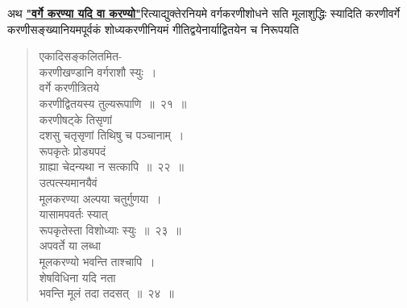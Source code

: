 \documentclass[11pt, openany]{book}
\begin{document}
 अथ \hyperref[19]{\textbf{"वर्गे करण्या यदि वा करण्यो"}}रित्याद्युक्तेरनियमे वर्गकरणीशोधने सति मूलाशुद्धिः स्यादिति करणीवर्गे करणीसङ्ख्यानियमपूर्वकं शोध्यकरणीनियमं गीतिद्वयेनार्याद्वितयेन च निरूपयति\textendash  
\begin{quote}
    \bs
      एकादिसङ्कलितमित-\\

\vspace{-7mm}
\hspace{1cm} करणीखण्डानि वर्गराशौ स्युः~। \\

\vspace{-7mm}
 वर्गे करणीत्रितये \\

\vspace{-7mm}
\hspace{1cm} करणीद्वितयस्य तुल्यरूपाणि~॥~२१~॥\\

 \vspace{-4mm}
 करणीषट्के तिसृणां \\

\vspace{-7mm}
\hspace{1cm} दशसु चतृसृणां तिथिषु च पञ्चानाम्~। \\

\vspace{-7mm}
 रूपकृतेः प्रोड्यपदं \\

\vspace{-7mm}
\hspace{1cm} ग्राह्या चेदन्यथा न सत्कापि~॥~२२~॥\\

 \vspace{-4mm}
 उत्पत्स्यमानयैवं \\

\vspace{-7mm}
\hspace{1cm} मूलकरण्या अल्पया चतुर्गुणया~। \\

\vspace{-7mm}
 यासामपवर्तः स्यात् \\

\vspace{-7mm}
\hspace{1cm} रूपकृतेस्ता विशोध्याः स्युः~॥~२३~॥\\

 \vspace{-4mm}
 अपवर्ते या लब्धा \\

\vspace{-7mm}
\hspace{1cm} मूलकरण्यो भवन्ति ताश्चापि~। \\

\vspace{-7mm}
 शेषविधिना यदि नता \\

\vspace{-7mm}
\hspace{1cm} भवन्ति मूलं तदा तदसत्~॥~२४~॥
\end{quote}
\end{document}
